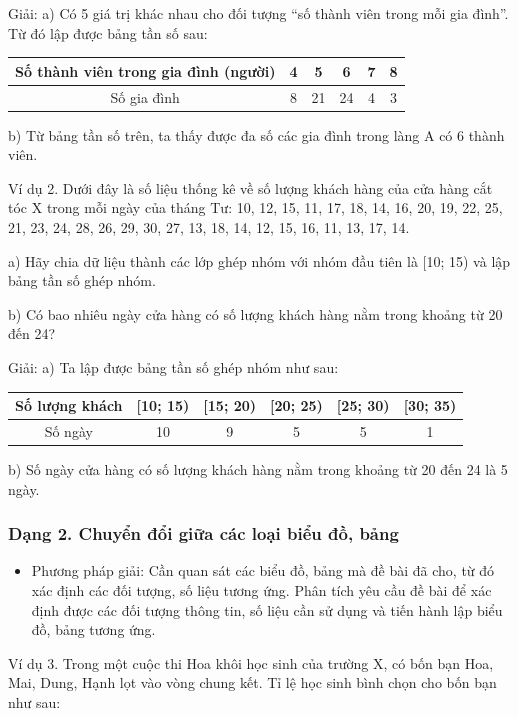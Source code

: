 \documentclass[%
    fontsize=12pt,%
    chapterprefix=false,%
    open=right,%
    twoside=false,%
    numbers=noenddot,%
    headings=optiontohead,%
    final,%
    DIV=15,%
    parskip=half %
]{scrbook}
\begin{document}
Giải: a) Có 5 giá trị khác nhau cho đối tượng ``số thành viên trong mỗi gia đình''. Từ đó lập được bảng tần số sau:

\begin{tabular}{|c|c|c|c|c|c|} \hline Số thành viên trong gia đình (người) & 4 & 5 & 6 & 7 & 8 \\ \hline Số gia đình & 8 & 21 & 24 & 4 & 3 \\ \hline \end{tabular}

b) Từ bảng tần số trên, ta thấy được đa số các gia đình trong làng A có 6 thành viên.

Ví dụ 2. Dưới đây là số liệu thống kê về số lượng khách hàng của cửa hàng cắt tóc X trong mỗi ngày của tháng Tư: 10, 12, 15, 11, 17, 18, 14, 16, 20, 19, 22, 25, 21, 23, 24, 28, 26, 29, 30, 27, 13, 18, 14, 12, 15, 16, 11, 13, 17, 14.

a) Hãy chia dữ liệu thành các lớp ghép nhóm với nhóm đầu tiên là [10; 15) và lập bảng tần số ghép nhóm.

b) Có bao nhiêu ngày cửa hàng có số lượng khách hàng nằm trong khoảng từ 20 đến 24?

Giải: a) Ta lập được bảng tần số ghép nhóm như sau:

\begin{tabular}{|c|c|c|c|c|c|} \hline Số lượng khách & [10; 15) & [15; 20) & [20; 25) & [25; 30) & [30; 35) \\ \hline Số ngày & 10 & 9 & 5 & 5 & 1 \\ \hline \end{tabular}


b) Số ngày cửa hàng có số lượng khách hàng nằm trong khoảng từ 20 đến 24 là 5 ngày.
\subsubsection{Dạng 2. Chuyển đổi giữa các loại biểu đồ, bảng}

\begin{itemize}
  \item Phương pháp giải: Cần quan sát các biểu đồ, bảng mà đề bài đã cho, từ đó xác định các đối tượng, số liệu tương ứng. Phân tích yêu cầu đề bài để xác định được các đối tượng thông tin, số liệu cần sử dụng và tiến hành lập biểu đồ, bảng tương ứng.
\end{itemize}

Ví dụ 3. Trong một cuộc thi Hoa khôi học sinh của trường X, có bốn bạn Hoa, Mai, Dung, Hạnh lọt vào vòng chung kết. Tỉ lệ học sinh bình chọn cho bốn bạn như sau:
\end{document}
